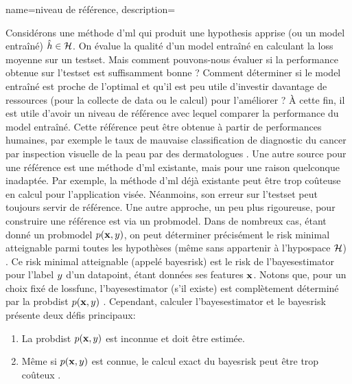 {name={niveau de référence},
	description={Considérons une méthode d'\gls{ml} qui produit une \gls{hypothesis} apprise 
		(ou un \gls{model} entraîné) $\hat{h} \in \mathcal{H}$. On évalue la qualité d’un \gls{model} entraîné 
		en calculant la \gls{loss} moyenne sur un \gls{testset}. Mais comment pouvons-nous évaluer 
		si la performance obtenue sur l'\gls{testset} est suffisamment bonne ? Comment 
		déterminer si le \gls{model} entraîné est proche de l’optimal et qu’il est peu utile 
		d’investir davantage de ressources (pour la collecte de \gls{data} ou le calcul) pour l’améliorer ? 
		À cette fin, il est utile d’avoir un niveau de référence avec lequel 
		comparer la performance du \gls{model} entraîné. Cette référence 
		peut être obtenue à partir de performances humaines, par exemple le taux de mauvaise classification de diagnostic du cancer par inspection visuelle de la peau par des dermatologues \cite{SkinHumanAI}. Une autre source pour une référence est une méthode d'\gls{ml} existante, 
		mais pour une raison quelconque inadaptée. Par exemple, la méthode d'\gls{ml} déjà existante 
		peut être trop coûteuse en calcul pour l’application visée. 
		Néanmoins, son erreur sur l'\gls{testset} peut toujours servir de référence. Une autre approche, un peu plus rigoureuse, 
		pour construire une référence est via un \gls{probmodel}. Dans de nombreux cas, étant donné un \gls{probmodel} $p({\bf x},y)$,  
		on peut déterminer précisément le \gls{risk} minimal atteignable parmi toutes les hypothèses
		(même sans appartenir à l’\gls{hypospace} $\mathcal{H}$) \cite{LC}. 
		Ce \gls{risk} minimal atteignable (appelé \gls{bayesrisk}) est le \gls{risk} 
		de l’\gls{bayesestimator} pour l’\gls{label} $y$ d’un \gls{datapoint}, étant données 
		ses \glspl{feature} ${\bf x}$. Notons que, pour un choix fixé de \gls{lossfunc}, l’\gls{bayesestimator} 
		(s’il existe) est complètement déterminé par la \gls{probdist} $p({\bf x},y)$ \cite[Ch. 4]{LC}. 
		Cependant, calculer l’\gls{bayesestimator} et le \gls{bayesrisk} présente deux 
		défis principaux:
		\begin{enumerate}[label=\arabic*)]
			\item La \gls{probdist} $p({\bf x},y)$ est inconnue et 
			doit être estimée.
			\item Même si $p({\bf x},y)$ est connue, 
			le calcul exact du \gls{bayesrisk} peut être trop coûteux \cite{cooper1990computational}. 
		\end{enumerate}
}}
